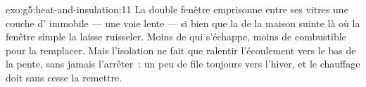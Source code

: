 \begin{solution}{exo:g5:heat-and-insulation:11}
La double fenêtre emprisonne entre ses vitres une couche d'
immobile --- une voie lente --- si bien que la  de la maison
suinte là où la fenêtre simple la laisse ruisseler. Moins de 
qui s'échappe, moins de combustible pour la remplacer. Mais
l'isolation ne fait que ralentir l'écoulement vers le bas de la
pente, sans jamais l'arrêter~: un peu de  file toujours vers
l'hiver, et le chauffage doit sans cesse la remettre.
\end{solution}
